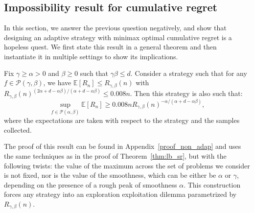 \documentclass[final,12pt]{colt2018}
\begin{document}
\subsection{Impossibility result for cumulative regret}
In this section, we answer the previous question negatively, and show that designing an adaptive strategy with minimax optimal cumulative regret is a hopeless quest. We first state this result in a general theorem and then instantiate it in multiple settings to show its implications.

\begin{theorem}\label{thm:adap_cumul}
Fix $\gamma \geq \alpha > 0$ and $\beta \geq 0$ such that $\gamma\beta \leq d$. Consider a strategy such that for any $f \in \mathcal P(\gamma, \beta)$, we have $\mathbb E[R_n] \leq R_{\gamma, \beta}(n)$ with $R_{\gamma,\beta}(n)^{(2\alpha+d-\alpha\beta)/(\alpha+d-\alpha\beta)} \leq 0.008n$. Then this strategy is also such that:
$$
\sup_{f \in \mathcal P(\alpha,\beta)} \mathbb E[R_n] \geq 0.008n R_{\gamma,\beta}(n)^{-\alpha/(\alpha+d-\alpha\beta)},
$$
where the expectations are taken with respect to the strategy and the samples collected.
\end{theorem}

The proof of this result can be found in Appendix~\ref{proof_non_adap} and uses the same techniques as in the proof of Theorem~\ref{thm:lb_sr}, but with the following twists: the value of the maximum across the set of problems we consider is not fixed, nor is the value of the smoothness, which can be either be $\alpha$ or $\gamma$, depending on the presence of a rough peak of smoothness $\alpha$. This construction forces any strategy into an exploration exploitation dilemma parametrized by $R_{\gamma,\beta}(n)$.\\
\end{document}
